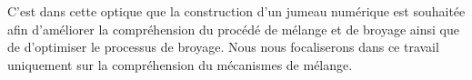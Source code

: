 C'est dans cette optique que la construction d'un jumeau numérique est souhaitée afin d'améliorer la compréhension du procédé de mélange et de broyage ainsi que de d'optimiser le processus de broyage. Nous nous focaliserons dans ce travail uniquement sur la compréhension du mécanismes de mélange.



